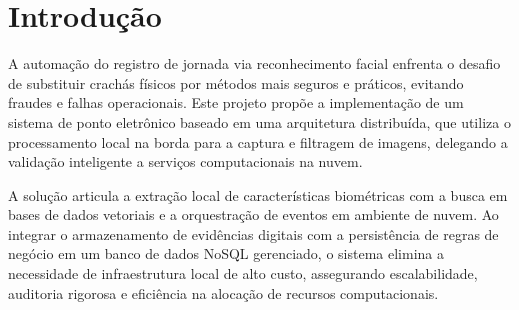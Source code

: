 \section{Introdução}



A automação do registro de jornada via reconhecimento facial enfrenta o desafio de substituir crachás físicos por métodos mais seguros e práticos, evitando fraudes e falhas operacionais. Este projeto propõe a implementação de um sistema de ponto eletrônico baseado em uma arquitetura distribuída, que utiliza o processamento local na borda para a captura e filtragem de imagens, delegando a validação inteligente a serviços computacionais na nuvem.

A solução articula a extração local de características biométricas com a busca em bases de dados vetoriais e a orquestração de eventos em ambiente de nuvem. Ao integrar o armazenamento de evidências digitais com a persistência de regras de negócio em um banco de dados NoSQL gerenciado, o sistema elimina a necessidade de infraestrutura local de alto custo, assegurando escalabilidade, auditoria rigorosa e eficiência na alocação de recursos computacionais.

